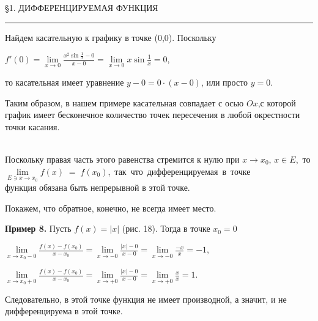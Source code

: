 \documentclass[a5paper,16pt]{book} %
\author{Матвей Попов}
\date{22 февраля 2021}
\begin{document}
	\begin{center}
		\begin{spacing}{0.3}
			§1. ДИФФЕРЕНЦИРУЕМАЯ ФУНКЦИЯ
			\noindent\rule{\textwidth}{1pt}
		\end{spacing}
	\end{center}
	Найдем касательную к графику в точке (0,0). Поскольку
	\begin{center}
	$f'(0) = \lim\limits_{x\to 0}\frac{x^2\sin\frac{1}{x} - 0}{x - 0} = \lim\limits_{x\to 0}x\sin\frac{1}{x} = 0$,
	\end{center}  то касательная имеет уравнение $y - 0 = 0 \cdot (x - 0)$, или просто $y = 0$.
	
	Таким образом, в нашем примере касательная совпадает с осью $Ox$,с которой график имеет бесконечное количество точек пересечения в любой окрестности точки касания.
	\begin{spacing}{2}
		
	\end{spacing}
	\\Поскольку правая часть этого равенства стремится к нулю при $x\to x_0$, $x \in E$,\, то\, $\lim\limits_{E\ni x\to x_0}f(x)\; =\; f(x_0)$,\, так\, что\, дифференцируемая\, в\, точке\\ функция обязана быть непрерывной в этой точке.
	
	Покажем, что обратное, конечно, не всегда имеет место.
	
	\textbf{Пример 8.} Пусть $f(x) = |x|$ (рис. 18). Тогда в точке $x_0 = 0$
	\begin{center}
		$\lim\limits_{x\to x_0-0}\frac{f(x) - f(x_0)}{x - x_0} = \lim\limits_{x\to -0}\frac{|x| - 0}{x - 0} = \lim\limits_{x\to -0}\frac{-x}{x} = -1$,
		
		$\lim\limits_{x\to x_0+0}\frac{f(x) - f(x_0)}{x - x_0} = \lim\limits_{x\to +0}\frac{|x| - 0}{x - 0} = \lim\limits_{x\to +0}\frac{x}{x} = 1$.
	\end{center}
	Следовательно, в этой точке функция не имеет производной, а значит, и не дифференцируема в этой точке.
	
\end{document}
